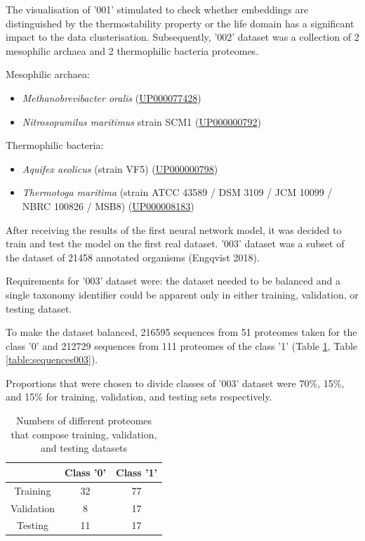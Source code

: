 \documentclass[12pt]{report}
\begin{document}
	The visualisation of '001' stimulated to check whether embeddings are 
	distinguished by the thermostability property or the life domain has a
	significant impact to the data clusterisation. Subsequently, '002' dataset 
	was a collection of 2 mesophilic archaea and 2 thermophilic bacteria
	proteomes.

	\vspace*{0.5cm}

	Mesophilic archaea:

	\begin{itemize}
		\item \textit{Methanobrevibacter oralis} 
		(\href{https://www.uniprot.org/proteomes/UP000077428}{UP000077428})
		\item \textit{Nitrosopumilus maritimus} strain SCM1 (\href{https://www.uniprot.org/proteomes/UP000000792}{UP000000792})
	\end{itemize}

	Thermophilic bacteria:

	\begin{itemize}
		\item \textit{Aquifex aeolicus} (strain VF5)
		(\href{https://www.uniprot.org/proteomes/UP000000798}{UP000000798})
		\item \textit{Thermotoga maritima} 
		(strain ATCC 43589 / DSM 3109 / JCM 10099 / NBRC 100826 / MSB8) 
		(\href{https://www.uniprot.org/proteomes/UP000008183}{UP000008183})
	\end{itemize}

	After receiving the results of the first neural network model, it was decided
	to train and test the model on the first real dataset. '003' dataset was a subset
	of the dataset of 21458 annotated organisms (Engqvist 2018). 
	
	Requirements for '003' dataset were: the dataset needed to be balanced and a
	single taxonomy identifier could be apparent only in either training, validation,
	or testing dataset. 
	
	To make the dataset balanced, 216595 sequences from 51 proteomes taken 
	for the class '0' and 212729 sequences from 111 proteomes of the class '1' 
	(Table \ref{table:proteomes003}, Table \ref{table:sequences003}).

	Proportions that were chosen to divide classes of '003'
	dataset were 70\%, 15\%, and 15\% for training, validation, and testing
	sets respectively.

	\begin{table}[h!]
		\caption{Numbers of different proteomes that compose training, 
		validation, and testing datasets}
		\vspace{0.2cm}
		\centering
		\begin{tabular}{ | c | c | c | }
			\hline
			& Class '0' & Class '1' \\
			\hline
			Training & 32 & 77 \\ 
			\hline
			Validation & 8 & 17 \\
			\hline
			Testing & 11 & 17 \\
			\hline   
		\end{tabular}
		\label{table:proteomes003}
	\end{table}
\end{document}

